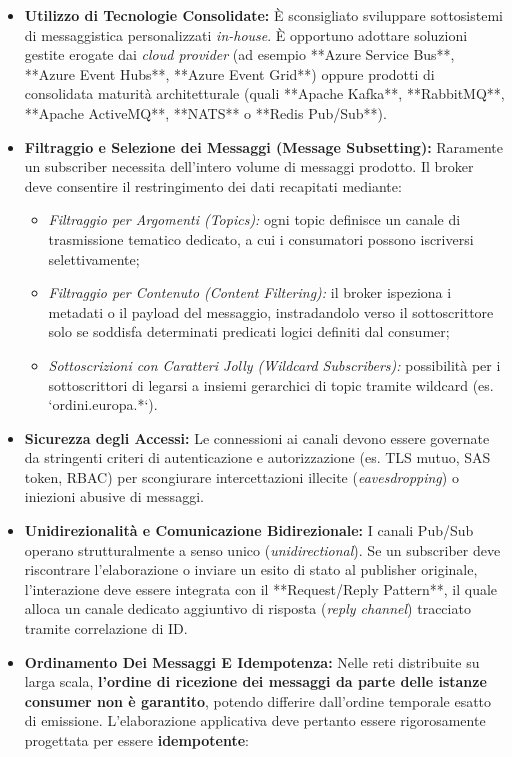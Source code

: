 \documentclass[11pt, a4paper]{article}
\begin{document}
\begin{itemize}
    \item \textbf{Utilizzo di Tecnologie Consolidate:} È sconsigliato sviluppare sottosistemi di messaggistica personalizzati \emph{in-house}. È opportuno adottare soluzioni gestite erogate dai \emph{cloud provider} (ad esempio **Azure Service Bus**, **Azure Event Hubs**, **Azure Event Grid**) oppure prodotti di consolidata maturità architetturale (quali **Apache Kafka**, **RabbitMQ**, **Apache ActiveMQ**, **NATS** o **Redis Pub/Sub**).
    \item \textbf{Filtraggio e Selezione dei Messaggi (Message Subsetting):} Raramente un subscriber necessita dell'intero volume di messaggi prodotto. Il broker deve consentire il restringimento dei dati recapitati mediante:
    \begin{itemize}[noitemsep]
        \item \emph{Filtraggio per Argomenti (Topics):} ogni topic definisce un canale di trasmissione tematico dedicato, a cui i consumatori possono iscriversi selettivamente;
        \item \emph{Filtraggio per Contenuto (Content Filtering):} il broker ispeziona i metadati o il payload del messaggio, instradandolo verso il sottoscrittore solo se soddisfa determinati predicati logici definiti dal consumer;
        \item \emph{Sottoscrizioni con Caratteri Jolly (Wildcard Subscribers):} possibilità per i sottoscrittori di legarsi a insiemi gerarchici di topic tramite wildcard (es. `ordini.europa.*`).
    \end{itemize}
    \item \textbf{Sicurezza degli Accessi:} Le connessioni ai canali devono essere governate da stringenti criteri di autenticazione e autorizzazione (es. TLS mutuo, SAS token, RBAC) per scongiurare intercettazioni illecite (\emph{eavesdropping}) o iniezioni abusive di messaggi.
    \item \textbf{Unidirezionalità e Comunicazione Bidirezionale:} I canali Pub/Sub operano strutturalmente a senso unico (\emph{unidirectional}). Se un subscriber deve riscontrare l'elaborazione o inviare un esito di stato al publisher originale, l'interazione deve essere integrata con il **Request/Reply Pattern**, il quale alloca un canale dedicato aggiuntivo di risposta (\emph{reply channel}) tracciato tramite correlazione di ID.
    \item \textbf{Ordinamento Dei Messaggi E Idempotenza:} Nelle reti distribuite su larga scala, \textbf{l'ordine di ricezione dei messaggi da parte delle istanze consumer non è garantito}, potendo differire dall'ordine temporale esatto di emissione. L'elaborazione applicativa deve pertanto essere rigorosamente progettata per essere \textbf{idempotente}:
\end{itemize}
\end{document}
